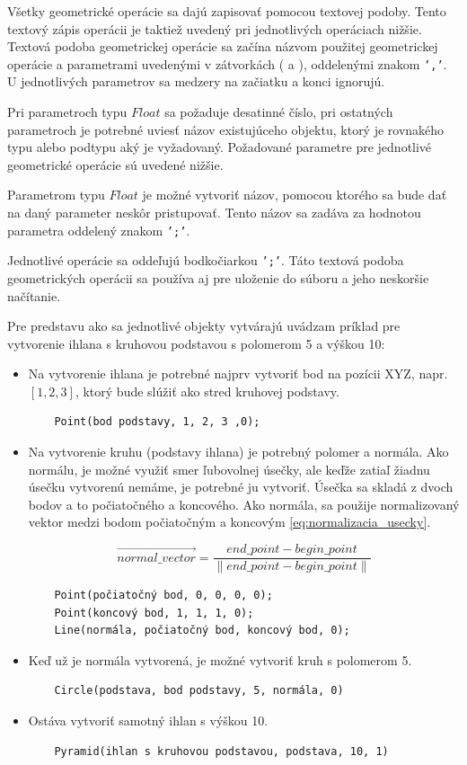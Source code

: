 Všetky geometrické operácie sa dajú zapisovať pomocou textovej podoby. Tento textový zápis operácii je taktiež uvedený pri jednotlivých operáciach nižšie. 
Textová podoba geometrickej operácie sa začína názvom použitej geometrickej operácie a parametrami uvedenými v zátvorkách ( a ), oddelenými znakom \texttt{','}.  U jednotlivých parametrov sa medzery na začiatku a konci ignorujú.

Pri parametroch typu $Float$ sa požaduje desatinné číslo, pri ostatných parametroch je potrebné uviesť názov existujúceho objektu, ktorý je rovnakého typu alebo podtypu aký je vyžadovaný. Požadované parametre pre jednotlivé geometrické operácie sú uvedené nižšie. 

Parametrom typu $Float$ je možné vytvoriť názov, pomocou ktorého sa bude dať na daný parameter neskôr pristupovať. 
Tento názov sa zadáva za hodnotou parametra oddelený znakom \texttt{';'}.

Jednotlivé operácie sa oddeľujú bodkočiarkou \texttt{';'}. 
Táto textová podoba geometrických operácii sa používa aj pre uloženie do súboru a jeho neskoršie načítanie. 

Pre predstavu ako sa jednotlivé objekty vytvárajú uvádzam príklad pre vytvorenie ihlana s kruhovou podstavou s polomerom 5 a výškou 10:
\begin{itemize}
    \item Na vytvorenie ihlana je potrebné najprv vytvoriť bod na pozícii XYZ, napr. $\left [ 1, 2, 3 \right ]$, ktorý bude slúžiť ako stred kruhovej podstavy.
	\begin{lstlisting}
	Point(bod podstavy, 1, 2, 3 ,0);
	\end{lstlisting}
	\item Na vytvorenie kruhu (podstavy ihlana) je potrebný polomer a normála. Ako normálu, je možné využiť smer ľubovolnej úsečky, ale keďže zatiaľ žiadnu úsečku vytvorenú nemáme, je potrebné ju vytvoriť. Úsečka sa skladá z dvoch bodov a to počiatočného a koncového. Ako normála, sa použije normalizovaný vektor medzi bodom počiatočným a koncovým \ref{eq:normalizacia_usecky}.

	\begin{equation}
		\overrightarrow{normal\_vector}=
		\frac{end\_point - begin\_point}{
		\left \|  end\_point - begin\_point \right \|}
	\label{eq:normalizacia_usecky}
	\end{equation}

	\begin{lstlisting}
	Point(počiatočný bod, 0, 0, 0, 0);
	Point(koncový bod, 1, 1, 1, 0);
	Line(normála, počiatočný bod, koncový bod, 0);
	\end{lstlisting}
	\item Keď už je normála vytvorená, je možné vytvoriť kruh s polomerom 5.
	\begin{lstlisting}
	Circle(podstava, bod podstavy, 5, normála, 0) 
	\end{lstlisting}
	\item Ostáva vytvoriť samotný ihlan s výškou 10.
	\begin{lstlisting}
	Pyramid(ihlan s kruhovou podstavou, podstava, 10, 1)
	\end{lstlisting}
\end{itemize}

